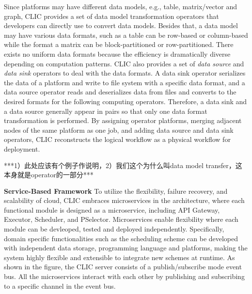 Since platforms may have different data models, e.g., table, matrix/vector and graph, CLIC provides a set of data model transformation operators that developers can directly use to convert data models.
Besides that, a data model may have various data formats, such as a table can be row-based or column-based while the format a matrix can be block-partitioned or row-partitioned.
There exists no uniform data formats because the efficiency is dramatically diverse depending on computation patterns.
CLIC also provides a set of \textit{data source} and \textit{data sink} operators to deal with the data formats. A data sink operator serializes the data of a platform and write to file system with a specific data format, and a data source operator reads and deserializes data from files and converts to the desired formats for the following computing operators. Therefore, a data sink and a data source generally appear in pairs so that only one data format transformation is performed. 
By assigning operator platforms, merging adjacent nodes of the same platform as one job, and adding data source and data sink operators, CLIC reconstructs the logical workflow as a physical workflow for deployment.


***1）此处应该有个例子作说明，2）我们这个为什么叫data model transfer，这本身就是operator的一部分***
 
\textbf{Service-Based Framework} To utilize the flexibility, failure recovery, and scalability of cloud, CLIC embraces microservices in the architecture, where each functional module is designed as a microservice, including API Gateway, Executor, Scheduler, and PSelector.
Microservices enable flexibility where each module can be devleoped, tested and deployed independently.
Specifically, domain specific functionalities such as the scheduling scheme can be developed with independent data storage, programming language and platforms, making the system highly flexible and extensible to integrate new schemes at runtime.
As shown in the figure, the CLIC server consists of a publish/subscribe mode event bus. All the microservices interact with each other by publishing and subscribing to a specific channel in the event bus.

